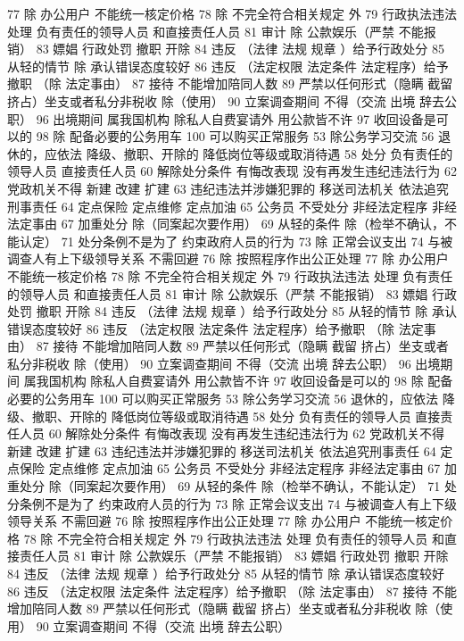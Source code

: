 \documentclass[cyan]{elegantnote}
\begin{document}
77 除 办公用户
不能统一核定价格
78 除 不完全符合相关规定 外
79 行政执法违法 处理
负有责任的领导人员
和直接责任人员
81 审计
除 公款娱乐（严禁 不能报销）
83 嫖娼 行政处罚
撤职 开除
84 违反 （法律 法规 规章 ）给予行政处分
85 从轻的情节
除 承认错误态度较好
86 违反 （法定权限 法定条件 法定程序）给予撤职
（除 法定事由）
87 接待 不能增加陪同人数
89 严禁以任何形式（隐瞒 截留 挤占）坐支或者私分非税收
除（使用）
90 立案调查期间 不得（交流 出境 辞去公职）
96 出境期间 属我国机构 除私人自费宴请外 用公款皆不许
97 收回设备是可以的
98 除 配备必要的公务用车
100 可以购买正常服务
53 除公务学习交流
56 退休的，应依法
降级、撤职、开除的 降低岗位等级或取消待遇
58 处分
负有责任的领导人员
直接责任人员
60 解除处分条件
有悔改表现
没有再发生违纪违法行为
62 党政机关不得
新建 改建 扩建
63 违纪违法并涉嫌犯罪的
移送司法机关
依法追究刑事责任
64 定点保险 定点维修 定点加油
65 公务员 不受处分
非经法定程序
非经法定事由
67 加重处分
除（同案起次要作用）
69 从轻的条件
除（检举不确认，不能认定）
71 处分条例不是为了
约束政府人员的行为
73 除 正常会议支出
74 与被调查人有上下级领导关系 不需回避
76 除 按照程序作出公正处理
77 除 办公用户
不能统一核定价格
78 除 不完全符合相关规定 外
79 行政执法违法 处理
负有责任的领导人员
和直接责任人员
81 审计
除 公款娱乐（严禁 不能报销）
83 嫖娼 行政处罚
撤职 开除
84 违反 （法律 法规 规章 ）给予行政处分
85 从轻的情节
除 承认错误态度较好
86 违反 （法定权限 法定条件 法定程序）给予撤职
（除 法定事由）
87 接待 不能增加陪同人数
89 严禁以任何形式（隐瞒 截留 挤占）坐支或者私分非税收
除（使用）
90 立案调查期间 不得（交流 出境 辞去公职）
96 出境期间 属我国机构 除私人自费宴请外 用公款皆不许
97 收回设备是可以的
98 除 配备必要的公务用车
100 可以购买正常服务
53 除公务学习交流
56 退休的，应依法
降级、撤职、开除的 降低岗位等级或取消待遇
58 处分
负有责任的领导人员
直接责任人员
60 解除处分条件
有悔改表现
没有再发生违纪违法行为
62 党政机关不得
新建 改建 扩建
63 违纪违法并涉嫌犯罪的
移送司法机关
依法追究刑事责任
64 定点保险 定点维修 定点加油
65 公务员 不受处分
非经法定程序
非经法定事由
67 加重处分
除（同案起次要作用）
69 从轻的条件
除（检举不确认，不能认定）
71 处分条例不是为了
约束政府人员的行为
73 除 正常会议支出
74 与被调查人有上下级领导关系 不需回避
76 除 按照程序作出公正处理
77 除 办公用户
不能统一核定价格
78 除 不完全符合相关规定 外
79 行政执法违法 处理
负有责任的领导人员
和直接责任人员
81 审计
除 公款娱乐（严禁 不能报销）
83 嫖娼 行政处罚
撤职 开除
84 违反 （法律 法规 规章 ）给予行政处分
85 从轻的情节
除 承认错误态度较好
86 违反 （法定权限 法定条件 法定程序）给予撤职
（除 法定事由）
87 接待 不能增加陪同人数
89 严禁以任何形式（隐瞒 截留 挤占）坐支或者私分非税收
除（使用）
90 立案调查期间 不得（交流 出境 辞去公职）
\end{document}
